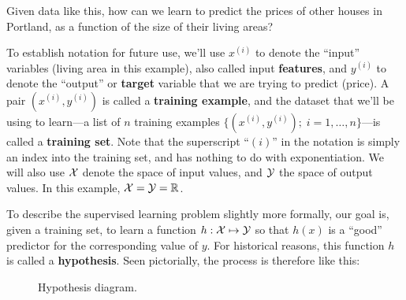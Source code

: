 Given data like this, how can we learn to predict the prices of other houses
in Portland, as a function of the size of their living areas?

To establish notation for future use, we'll use $x^{(i)}$ to denote the ``input''
variables (living area in this example), also called input \textbf{features}, and $y^{(i)}$
to denote the ``output'' or \textbf{target} variable that we are trying to predict
(price). A pair $(x^{(i)}, y^{(i)})$ is called a \textbf{training example}, and the dataset
that we'll be using to learn---a list of $n$ training examples $\{(x^{(i)}, y^{(i)} );\; i =
1,\ldots,n\}$---is called a \textbf{training set}. Note that the superscript ``$(i)$'' in the
notation is simply an index into the training set, and has nothing to do with
exponentiation. We will also use $\cal X$ denote the space of input values, and $\cal Y$
the space of output values. In this example, $\cal X = \cal Y = \bb R$.

To describe the supervised learning problem slightly more formally, our
goal is, given a training set, to learn a function $h: \cal X \mapsto \cal Y$ so that $h(x)$ is a
``good'' predictor for the corresponding value of $y$. For historical reasons, this
function $h$ is called a \textbf{hypothesis}. Seen pictorially, the process is therefore
like this:

\begin{figure}
\begin{center}
\caption{\label{fig:hypothesis} Hypothesis diagram.}
\end{center}
\end{figure}

